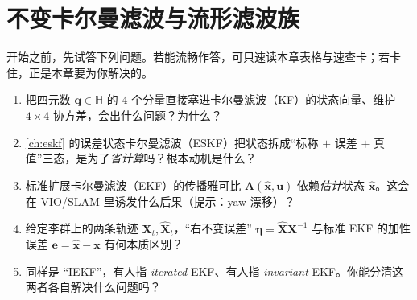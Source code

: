 \chapter{不变卡尔曼滤波与流形滤波族}
\label{ch:invariant-filter}


\begin{practice}[前置自测]
开始之前，先试答下列问题。若能流畅作答，可只速读本章表格与速查卡；若卡住，正是本章要为你解决的。
\begin{enumerate}
  \item 把四元数 $\mathbf{q}\in\mathbb{H}$ 的 $4$ 个分量直接塞进卡尔曼滤波（KF）的状态向量、维护 $4\times4$ 协方差，会出什么问题？为什么？
  \item \cref{ch:eskf} 的误差状态卡尔曼滤波（ESKF）把状态拆成“标称 $+$ 误差 $+$ 真值”三态，是为了\emph{省计算}吗？根本动机是什么？
  \item 标准扩展卡尔曼滤波（EKF）的传播雅可比 $\mathbf{A}(\hat{\mathbf{x}},\mathbf{u})$ 依赖\emph{估计}状态 $\hat{\mathbf{x}}$。这会在 VIO/SLAM 里诱发什么后果（提示：yaw 漂移）？
  \item 给定李群上的两条轨迹 $\mathbf{X}_t,\hat{\mathbf{X}}_t$，“右不变误差” $\boldsymbol{\eta}=\hat{\mathbf{X}}\mathbf{X}^{-1}$ 与标准 EKF 的加性误差 $\mathbf{e}=\hat{\mathbf{x}}-\mathbf{x}$ 有何本质区别？
  \item 同样是 “IEKF”，有人指 \emph{iterated} EKF、有人指 \emph{invariant} EKF。你能分清这两者各自解决什么问题吗？
\end{enumerate}
\end{practice}

